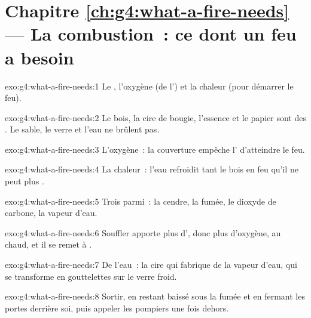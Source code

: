 \section*{Chapitre \ref{ch:g4:what-a-fire-needs} --- La combustion~: ce dont un feu a besoin}

\begin{solution}{exo:g4:what-a-fire-needs:1}
Le , l'oxygène (de l') et la chaleur (pour démarrer le
feu).
\end{solution}

\begin{solution}{exo:g4:what-a-fire-needs:2}
Le bois, la cire de bougie, l'essence et le papier sont des
. Le sable, le verre et l'eau ne brûlent pas.
\end{solution}

\begin{solution}{exo:g4:what-a-fire-needs:3}
L'oxygène~: la couverture empêche l' d'atteindre le feu.
\end{solution}

\begin{solution}{exo:g4:what-a-fire-needs:4}
La chaleur~: l'eau refroidit tant le bois en feu qu'il ne peut plus
.
\end{solution}

\begin{solution}{exo:g4:what-a-fire-needs:5}
Trois parmi~: la cendre, la fumée, le dioxyde de carbone, la vapeur
d'eau.
\end{solution}

\begin{solution}{exo:g4:what-a-fire-needs:6}
Souffler apporte plus d', donc plus d'oxygène, au  chaud,
et il se remet à .
\end{solution}

\begin{solution}{exo:g4:what-a-fire-needs:7}
De l'eau~: la cire qui  fabrique de la vapeur d'eau, qui se
transforme en gouttelettes sur le verre froid.
\end{solution}

\begin{solution}{exo:g4:what-a-fire-needs:8}
Sortir, en restant baissé sous la fumée et en fermant les portes
derrière soi, puis appeler les pompiers une fois dehors.
\end{solution}

